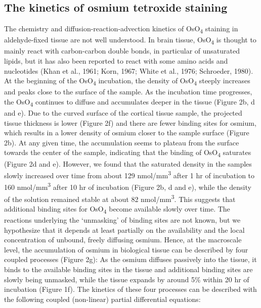 \documentclass{article}
\begin{document}
\subsection*{The kinetics of osmium tetroxide staining}
The chemistry and diffusion-reaction-advection kinetics of OsO\textsubscript{4} staining in aldehyde-fixed tissue are not well understood. In brain tissue, OsO\textsubscript{4} is thought to mainly react with carbon-carbon double bonds, in particular of unsaturated lipids, but it has also been reported to react with some amino acids and nucleotides (Khan et al., 1961; Korn, 1967; White et al., 1976; Schroeder, 1980). At the beginning of the OsO\textsubscript{4} incubation, the density of OsO\textsubscript{4} steeply increases and peaks close to the surface of the sample. As the incubation time progresses, the OsO\textsubscript{4} continues to diffuse and accumulates deeper in the tissue (Figure 2b, d and e). Due to the curved surface of the cortical tissue sample, the projected tissue thickness is lower (Figure 2f) and there are fewer binding sites for osmium, which results in a lower density of osmium closer to the sample surface (Figure 2b). At any given time, the accumulation seems to plateau from the surface towards the center of the sample, indicating that the binding of OsO\textsubscript{4} saturates (Figure 2d and e). However, we found that the saturated density in the samples slowly increased over time from about 129 nmol/mm\textsuperscript{3} after 1 hr of incubation to 160 nmol/mm\textsuperscript{3} after 10 hr of incubation (Figure 2b, d and e), while the density of the solution remained stable at about 82 nmol/mm\textsuperscript{3}. This suggests that additional binding sites for OsO\textsubscript{4} become available slowly over time. The reactions underlying the ‘unmasking’ of binding sites are not known, but we hypothesize that it depends at least partially on the availability and the local concentration of unbound, freely diffusing osmium. Hence, at the macroscale level, the accumulation of osmium in biological tissue can be described by four coupled processes (Figure 2g): As the osmium diffuses passively into the tissue, it binds to the available binding sites in the tissue and additional binding sites are slowly being unmasked, while the tissue expands by around 5\% within 20 hr of incubation (Figure 1f). The kinetics of these four processes can be described with the following coupled (non-linear) partial differential equations:
\end{document}
